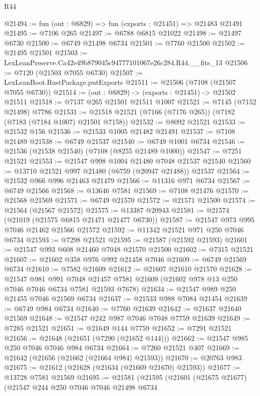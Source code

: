 \begin{lexlean}{R44}
\begin{coremodule}
{@21494 := fun (out : @6829) => fun (exports : @21451) => @21483 @21491
@21495 := @7106 @265
@21497 := @6788 @6815 @21022
@21498 := @21497 @6730
@21500 := @6749 @21498 @6734
@21501 := @7760 @21500
@21502 := @21495 @21501
@21503 := LexLeanPreserve.Ca42e49b879045c94777101067e26c284.R44.__fits_13
@21506 := @7120 (@21503 @7055 @6730)
@21507 := LexLeanBoot.RustPackage.putExports
@21511 := @21506 (@7108 (@21507 @7055 @6730))
@21514 := (out : @6829) -> (exports : @21451) -> @21502 @21511
@21518 := @7137 @265 @21501 @21511 @1007
@21521 := @7145 (@7152 @21498) @7786
@21531 := @21518 @21521 (@7166 (@7176 @265)) (@7182 (@7183 (@7184 @1007) @21501 @7158))
@21532 := @8092 @21521
@21533 := @21532 @156
@21536 := @21533 @1005 @21482 @21491
@21537 := @7108 @21489
@21538 := @6749 @21537
@21540 := @6749 @1001 @6734
@21546 := @21536 (@21538 @21540) (@7108 (@8255 @21489 @1000))
@21547 := @7251 @21521
@21553 := @21547 @998 @1004 @21480 @7048 @21537 @21540
@21560 := @13710 @21521 @997 @21480 (@6759 (@20947 @21488)) @21537
@21564 := @21532 @966 @996 @21463 @21479
@21566 := @11316 @971 @6734
@21567 := @6749 @21566
@21568 := @13646 @7581
@21569 := @7108 @21476
@21570 := @21568 @21569
@21571 := @6749 @21570
@21572 := @21571 @21500
@21574 := @21564 (@21567 @21572)
@21575 := @13387 @20943
@21581 := @21574 (@21019 (@21575 @6815 @21471 @21477 @6730))
@21587 := @21547 @973 @995 @7046 @21462 @21566 @21572
@21592 := @11342 @21521 @971 @250 @7046 @6734
@21593 := @7298 @21521
@21595 := @21587 (@21592 @21593)
@21601 := @21547 @993 @608 @21460 @7048 @21570 @21500
@21602 := @7315 @21521
@21607 := @21602 @358 @976 @992 @21458 @7046
@21609 := @6749 @21569 @6734
@21610 := @7582 @21609
@21612 := @21607 @21610 @21570
@21628 := @21547
    @981
    @991
    @7048
    @21457
    @7581
    @21609
    (@21602 @978 @13 @250 @7046 @7046 @6734 @7581 @21593 @7678)
@21634 := @21547 @989 @250 @21455 @7046 @21569 @6734
@21637 := @21533 @988 @7084 @21454
@21639 := @6749 @984 @6734
@21640 := @7760 @21639
@21642 := @21637 @21640 @21569
@21648 := @21547 @242 @987 @7046 @7048 @7759 @21639
@21649 := @7285 @21521
@21651 := @21649 @144 @7759
@21652 := @7291 @21521
@21656 := @21648 (@21651 (@7290 (@21652 @144)))
@21662 := @21547 @985 @250 @7046 @7046 @984 @6734
@21664 := @7260 @21521 @407
@21669 := @21642 (@21656 (@21662 (@21664 @984) @21593))
@21670 := @20763 @983
@21675 := @21612 (@21628 (@21634 (@21669 @21670) @21593))
@21677 := @13728 @7581 @21569
@21695 := @21581
    (@21595
      (@21601
        (@21675 @21677)
        (@21547
          @244
          @250
          @7046
          @7046
          @21498
          @6734
}
\end{coremodule}
\end{lexlean}

